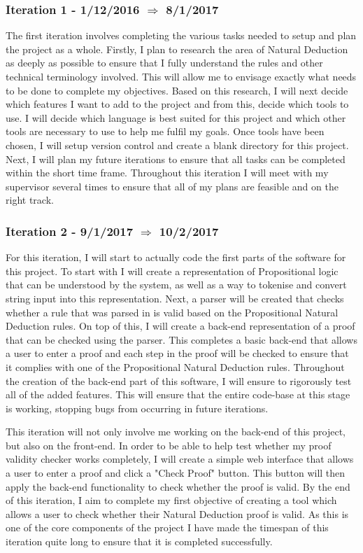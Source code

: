 \subsubsection{Iteration 1 - 1/12/2016 $\Rightarrow$ 8/1/2017}

The first iteration involves completing the various tasks needed to setup and plan the project as a whole. Firstly, I plan to research the area of Natural Deduction as deeply as possible to ensure that I fully understand the rules and other technical terminology involved. This will allow me to envisage exactly what needs to be done to complete my objectives. Based on this research, I will next decide which features I want to add to the project and from this, decide which tools to use. I will decide which language is best suited for this project and which other tools are necessary to use to help me fulfil my goals. Once tools have been chosen, I will setup version control and create a blank directory for this project. Next, I will plan my future iterations to ensure that all tasks can be completed within the short time frame. Throughout this iteration I will meet with my supervisor several times to ensure that all of my plans are feasible and on the right track.

\subsubsection{Iteration 2 - 9/1/2017 $\Rightarrow$ 10/2/2017}

For this iteration, I will start to actually code the first parts of the software for this project. To start with I will create a representation of Propositional logic that can be understood by the system, as well as a way to tokenise and convert string input into this representation. Next, a parser will be created that checks whether a rule that was parsed in is valid based on the Propositional Natural Deduction rules. On top of this, I will create a back-end representation of a proof that can be checked using the parser. This completes a basic back-end that allows a user to enter a proof and each step in the proof will be checked to ensure that it complies with one of the Propositional Natural Deduction rules. Throughout the creation of the back-end part of this software, I will ensure to rigorously test all of the added features. This will ensure that the entire code-base at this stage is working, stopping bugs from occurring in future iterations. 

This iteration will not only involve me working on the back-end of this project, but also on the front-end. In order to be able to help test whether my proof validity checker works completely, I will create a simple web interface that allows a user to enter a proof and click a "Check Proof" button. This button will then apply the back-end functionality to check whether the proof is valid. By the end of this iteration, I aim to complete my first objective of creating a tool which allows a user to check whether their Natural Deduction proof is valid. As this is one of the core components of the project I have made the timespan of this iteration quite long to ensure that it is completed successfully.

